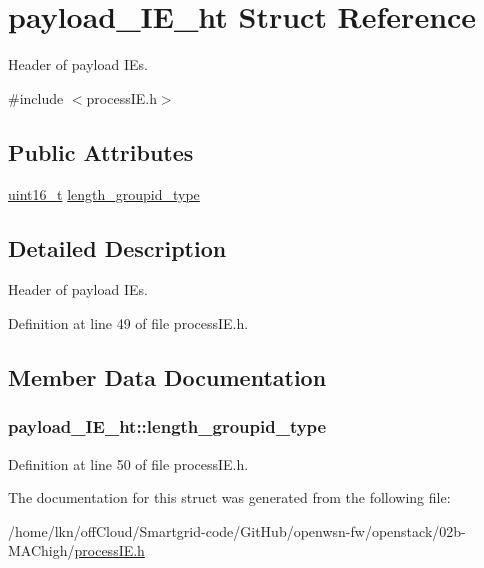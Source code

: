 \hypertarget{structpayload___i_e__ht}{}\section{payload\+\_\+\+I\+E\+\_\+ht Struct Reference}
\label{structpayload___i_e__ht}


Header of payload I\+Es.  




{\ttfamily \#include $<$process\+I\+E.\+h$>$}

\subsection*{Public Attributes}
\begin{DoxyCompactItemize}
\item 
\hyperlink{_p_e___types_8h_a1f1825b69244eb3ad2c7165ddc99c956}{uint16\+\_\+t} \hyperlink{structpayload___i_e__ht_a441442f6d486db31ee77bcfc8cfb8207}{length\+\_\+groupid\+\_\+type}
\end{DoxyCompactItemize}


\subsection{Detailed Description}
Header of payload I\+Es. 

Definition at line 49 of file process\+I\+E.\+h.



\subsection{Member Data Documentation}
\subsubsection[{\texorpdfstring{length\+\_\+groupid\+\_\+type}{length_groupid_type}}]{ payload\+\_\+\+I\+E\+\_\+ht\+::length\+\_\+groupid\+\_\+type}\hypertarget{structpayload___i_e__ht_a441442f6d486db31ee77bcfc8cfb8207}{}\label{structpayload___i_e__ht_a441442f6d486db31ee77bcfc8cfb8207}


Definition at line 50 of file process\+I\+E.\+h.



The documentation for this struct was generated from the following file\+:\begin{DoxyCompactItemize}
\item 
/home/lkn/off\+Cloud/\+Smartgrid-\/code/\+Git\+Hub/openwsn-\/fw/openstack/02b-\/\+M\+A\+Chigh/\hyperlink{process_i_e_8h}{process\+I\+E.\+h}\end{DoxyCompactItemize}
